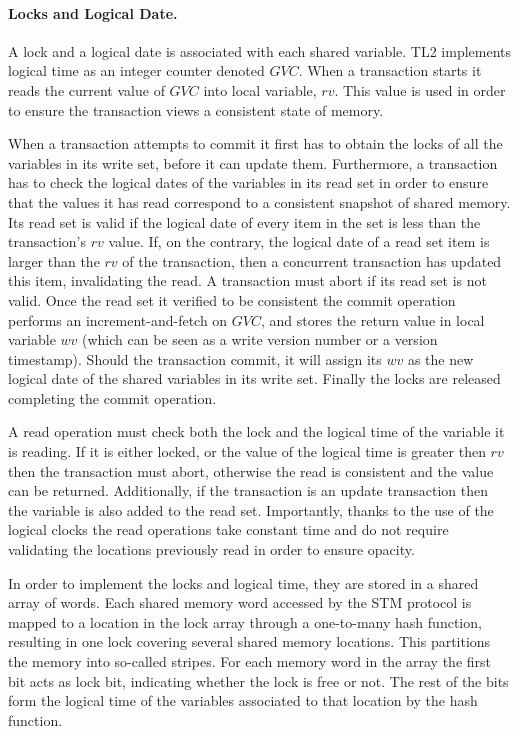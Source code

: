 \paragraph{Locks and Logical Date.}
A lock and a logical date is associated with each shared variable.  
TL2 implements logical time as an integer counter denoted $\mathit{GVC}$.
When a transaction starts it reads the current value of $\mathit{GVC}$ into local variable, $\mathit{rv}$. 
This value is used in order to ensure the transaction views a consistent state of memory.

When a transaction attempts to commit it  first  has to  obtain  the  locks  of all the
variables in its write set, before it can  
update them.
Furthermore, a  transaction has to  check the logical dates  of the
variables in its read set in  
order to  ensure that  the values  it has read  correspond to  a consistent
snapshot of shared memory.
Its read set is valid if the logical date of every  item in the set is less than the transaction{}'s $\mathit{rv}$  value. 
If, on the  contrary, the logical date of a read set  item is larger than the $\mathit{rv}$ 
of the transaction,  then  a concurrent  transaction 
has updated this item, invalidating the read.
A transaction must abort if its read set is not valid.  
Once the read set it verified to be consistent the commit operation performs an increment-and-fetch on $\mathit{GVC}$, and stores the 
return value in local variable $\mathit{wv}$ (which can be seen as a write version number  or a version timestamp). 
Should the transaction commit, it will assign its $\mathit{wv}$ as the new logical date of the shared variables in its write set.
Finally the locks are released completing the commit operation.

A read operation must check both the lock and the logical time of the variable it is reading.
If it is either locked, or the value of the logical time is greater then $\mathit{rv}$ then the transaction must abort,
otherwise the read is consistent and the value can be returned.
Additionally, if the transaction is an update transaction then the variable is also added to the read set.
Importantly, thanks to the use of the logical clocks the read operations take constant time
and do not require validating the locations previously read in order to ensure opacity.

In order to implement the locks and logical time, they  are stored in  a shared array
of words.
Each shared memory  word accessed by the STM protocol is
mapped to a location in the lock array through a  
one-to-many hash function,  resulting in one
lock covering several shared  
memory locations. This  partitions the memory into  so-called stripes. 
For each memory word in the array
the first bit acts as lock  bit, indicating whether the lock  is free or
not. The rest of the bits form the  
logical time of the variables associated to that location by the hash function.


